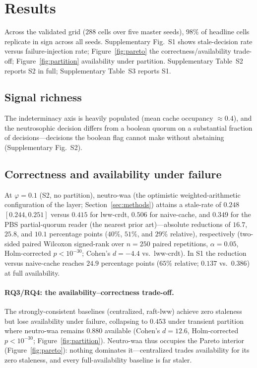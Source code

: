\documentclass[11pt]{article}
\begin{document}
\section{Results}
\label{sec:results}

Across the validated grid ($288$ cells over five master seeds), $98\%$ of headline cells replicate
in sign across all seeds.
Supplementary Fig.~S1 shows stale-decision rate versus failure-injection rate; Figure~\ref{fig:pareto}
the correctness/availability trade-off; Figure~\ref{fig:partition} availability under partition.
Supplementary Table~S2 reports S2 in full; Supplementary Table~S3 reports S1.

\subsection{Signal richness}
The indeterminacy axis is heavily populated (mean cache occupancy
$\approx 0.4$), and the neutrosophic decision differs from a boolean quorum on a substantial fraction
of decisions---decisions the boolean flag cannot make without abstaining (Supplementary Fig.~S2).

\subsection{Correctness and availability under failure}
At $\varphi=0.1$ (S2, no partition),
neutro-waa (the optimistic weighted-arithmetic configuration of the layer; Section~\ref{sec:methods})
attains a stale-rate of $0.248$ $[0.244,0.251]$ versus $0.415$ for lww-crdt, $0.506$ for
naive-cache, and $0.349$ for the PBS partial-quorum reader (the nearest prior art)---absolute reductions of
$16.7$, $25.8$, and $10.1$ percentage points ($40\%$, $51\%$, and $29\%$ relative), respectively
(two-sided paired Wilcoxon signed-rank over $n=250$ paired repetitions, $\alpha=0.05$, Holm-corrected
$p<10^{-30}$; Cohen's $d=-4.4$ vs.\ lww-crdt). In S1 the reduction versus naive-cache reaches $24.9$
percentage points ($65\%$ relative; $0.137$ vs.\ $0.386$)
at full availability.

\paragraph{RQ3/RQ4: the availability--correctness trade-off.} The strongly-consistent baselines
(centralized, raft-lww) achieve zero staleness but lose availability under failure, collapsing to
$0.453$ under transient partition where neutro-waa remains $0.880$ available
(Cohen's $d=12.6$, Holm-corrected $p<10^{-30}$; Figure~\ref{fig:partition}). Neutro-waa thus occupies the
Pareto interior (Figure~\ref{fig:pareto}): nothing dominates it---centralized trades availability for
its zero staleness, and every full-availability baseline is far staler.
\end{document}
